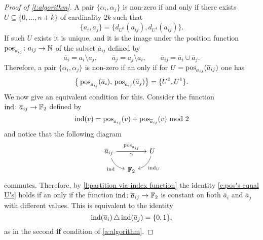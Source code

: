 \begin{proof}[Proof of \cref{t:algorithm}]
	A pair $\{\alpha_i, \alpha_j\}$ is non-zero if and only if there exists $U \subseteq \{0, \dots, n+k\}$ of cardinality $2k$ such that
	\[
	\{a_i, a_j\} =\{d_{U^0}(a_{ij}), d_{U^1}(a_{ij})\}.
	\]
	If such $U$ exists it is unique, and it is the image under the position function $\operatorname{pos}_{a_{ij}} \colon {a}_{ij} \to \mathbb{N}$ of the subset $\overline{a}_{ij}$ defined by
	\begin{equation*}
	\overline{a}_{i} = a_i \setminus a_j, \qquad
	\overline{a}_{j} = a_j \setminus a_i, \qquad
	\overline{a}_{ij} = \overline{a}_i \cup \overline{a}_j.
	\end{equation*}
	Therefore, a pair $\{\alpha_i, \alpha_j\}$ is non-zero if an only if for $U = \operatorname{pos}_{a_{ij}}(\overline{a}_{ij})$ one has
	\begin{equation} \label{e:pos's equal U's}
	\big\{\operatorname{pos}_{a_{ij}}(\overline{a}_i),\, \operatorname{pos}_{a_{ij}}(\overline{a}_j)\big\} = \{U^0, U^1\}.
	\end{equation}
	We now give an equivalent condition for this.
	Consider the function $\mathrm{ind} \colon \overline{a}_{ij} \to {\mathbb{F}_2}$ defined by
	\[
	\mathrm{ind}(v) =
	\operatorname{pos}_{a_{ij}}(v) + \operatorname{pos}_{\overline{a}_{ij}}(v) \text{ mod }2
	\]
	and notice that the following diagram
	\[
	\begin{tikzcd}[column sep=small, row sep=small]
	\overline{a}_{ij} \arrow[rr, "\pos_{a_{ij}}", "\cong"'] \arrow[dr, "\ind"', bend right] & &
	U \arrow[dl, "\ind_U", bend left] \\
	& \Ftwo &
	\end{tikzcd}
	\]
	commutes.
	Therefore, by \cref{l:partition via index function} the identity \eqref{e:pos's equal U's} holds if an only if the function $\mathrm{ind} \colon \overline{a}_{ij} \to {\mathbb{F}_2}$ is constant on both $\overline{a}_i$ and $\overline{a}_j$ with different values.
	This is equivalent to the identity
	\begin{equation*}
	\mathrm{ind}(\overline{a}_i) \operatorname{\triangle} \mathrm{ind}(\overline{a}_j) = \{0,1\},
	\end{equation*}
	as in the second \textbf{if} condition of \cref{a:algorithm}.
\end{proof}